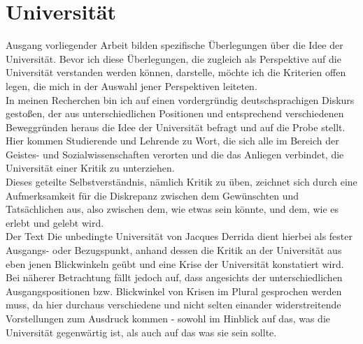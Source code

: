 \section{Universität}

Ausgang vorliegender Arbeit bilden spezifische Überlegungen über die Idee der
Universität. Bevor ich diese Überlegungen, die zugleich als
Perspektive auf die Universität verstanden werden können, darstelle, möchte ich die
Kriterien offen legen, die mich in der Auswahl jener Perspektiven leiteten.\\

\noindent In meinen Recherchen bin ich auf einen vordergründig deutschsprachigen Diskurs
gestoßen, der aus unterschiedlichen Positionen und entsprechend verschiedenen
Beweggründen heraus die Idee der Universität befragt und auf die Probe stellt.
Hier kommen Studierende\footnotemark {} und Lehrende\footnotemark {} zu Wort, die sich alle im Bereich der Geistes- und
  Sozialwissenschaften verorten und die das Anliegen verbindet, die Universität
  einer Kritik zu unterziehen.\\
  Dieses geteilte Selbstverständnis, nämlich
  Kritik zu üben, zeichnet sich durch eine Aufmerksamkeit für die Diskrepanz
  zwischen dem Gewünschten und Tatsächlichen aus, also zwischen dem, wie etwas
  sein könnte, und dem, wie es erlebt und gelebt wird.\footnotemark
   \\
  Der Text \glqq Die
  unbedingte Universität\grqq\footnotemark {} von Jacques Derrida dient hierbei als fester
  Ausgangs- oder Bezugspunkt, anhand dessen die Kritik an der Universität aus
  eben jenen Blickwinkeln geübt und eine Krise der Universität konstatiert
  wird.  Bei näherer Betrachtung fällt jedoch auf, dass angesichts der
  unterschiedlichen Ausgangspositionen bzw. Blickwinkel von Krisen im Plural
  gesprochen werden muss, da hier durchaus verschiedene und nicht selten
  einander widerstreitende Vorstellungen zum Ausdruck kommen - sowohl im
  Hinblick auf das, was die Universität gegenwärtig ist, als auch auf das was sie sein
  sollte. \\

